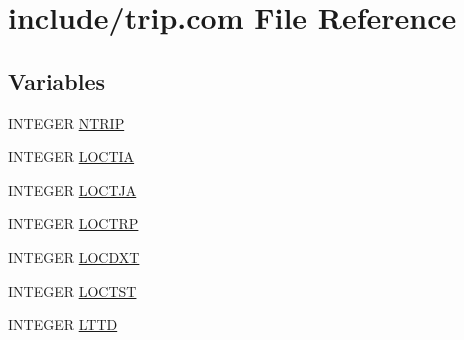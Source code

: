 \hypertarget{home_2abonfi_2_c_f_d__codes_2_eul_f_s_83_84_2include_2trip_8com}{\section{include/trip.com File Reference}
\label{home_2abonfi_2_c_f_d__codes_2_eul_f_s_83_84_2include_2trip_8com}
}
\subsection*{Variables}
\begin{DoxyCompactItemize}
\item 
I\-N\-T\-E\-G\-E\-R \hyperlink{home_2abonfi_2_c_f_d__codes_2_eul_f_s_83_84_2include_2trip_8com_a3d7b914361a6e11bdeb7e6b866517781}{N\-T\-R\-I\-P}
\item 
I\-N\-T\-E\-G\-E\-R \hyperlink{home_2abonfi_2_c_f_d__codes_2_eul_f_s_83_84_2include_2trip_8com_a9410695829be46f3379b92d229aab0aa}{L\-O\-C\-T\-I\-A}
\item 
I\-N\-T\-E\-G\-E\-R \hyperlink{home_2abonfi_2_c_f_d__codes_2_eul_f_s_83_84_2include_2trip_8com_a6b0b8b0dad59abf485e0f27ae437ea82}{L\-O\-C\-T\-J\-A}
\item 
I\-N\-T\-E\-G\-E\-R \hyperlink{home_2abonfi_2_c_f_d__codes_2_eul_f_s_83_84_2include_2trip_8com_a7338c756eee0f214801ca3c7c3b5f6ee}{L\-O\-C\-T\-R\-P}
\item 
I\-N\-T\-E\-G\-E\-R \hyperlink{home_2abonfi_2_c_f_d__codes_2_eul_f_s_83_84_2include_2trip_8com_a23376c308ff91ab97412c3efa31ea746}{L\-O\-C\-D\-X\-T}
\item 
I\-N\-T\-E\-G\-E\-R \hyperlink{home_2abonfi_2_c_f_d__codes_2_eul_f_s_83_84_2include_2trip_8com_a1da3a79d56d60efb2ec802079caef607}{L\-O\-C\-T\-S\-T}
\item 
I\-N\-T\-E\-G\-E\-R \hyperlink{home_2abonfi_2_c_f_d__codes_2_eul_f_s_83_84_2include_2trip_8com_a0d4fc998108c0f869ce087a3b54bdca6}{L\-T\-T\-D}
\end{DoxyCompactItemize}


